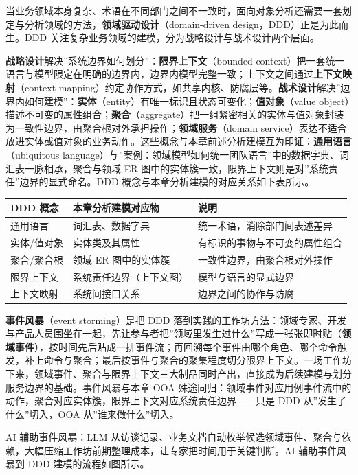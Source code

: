 \documentclass[
]{ctexbook}
\newcounter{none}
\begin{document}
当业务领域本身复杂、术语在不同部门之间不一致时，面向对象分析还需要一套划定与分析领域的方法，\textbf{领域驱动设计}（domain-driven
design，DDD）正是为此而生。DDD
关注复杂业务领域的建模，分为战略设计与战术设计两个层面。

\textbf{战略设计}解决''系统边界如何划分''：\textbf{限界上下文}（bounded
context）把一套统一语言与模型限定在明确的边界内，边界内模型完整一致；上下文之间通过\textbf{上下文映射}（context
mapping）约定协作方式，如共享内核、防腐层等。\textbf{战术设计}解决''边界内如何建模''：\textbf{实体}（entity）有唯一标识且状态可变化；\textbf{值对象}（value
object）描述不可变的属性组合；\textbf{聚合}（aggregate）把一组紧密相关的实体与值对象封装为一致性边界，由聚合根对外承担操作；\textbf{领域服务}（domain
service）表达不适合放进实体或值对象的业务动作。这些概念与本章前述分析建模互为印证：\textbf{通用语言}（ubiquitous
language）与''案例：领域模型如何统一团队语言''中的数据字典、词汇表一脉相承，聚合与领域
ER 图中的实体簇一致，限界上下文则是对''系统责任''边界的显式命名。DDD
概念与本章分析建模的对应关系如下表所示。

{\def\LTcaptype{none} %
\begin{longtable}[]{@{}lll@{}}
\toprule\noalign{}
DDD 概念 & 本章分析建模对应物 & 说明 \\
\midrule\noalign{}
\endhead
\bottomrule\noalign{}
\endlastfoot
通用语言 & 词汇表、数据字典 & 统一术语，消除部门间表述差异 \\
实体/值对象 & 实体类及其属性 & 有标识的事物与不可变的属性组合 \\
聚合/聚合根 & 领域 ER 图中的实体簇 & 一致性边界，由聚合根对外操作 \\
限界上下文 & 系统责任边界（上下文图） & 模型与语言的显式边界 \\
上下文映射 & 系统间接口关系 & 边界之间的协作与防腐 \\
\end{longtable}
}

\textbf{事件风暴}（event storming）是把 DDD
落到实践的工作坊方法：领域专家、开发与产品人员围坐在一起，先让参与者把''领域里发生过什么''写成一张张即时贴（\textbf{领域事件}），按时间先后贴成一排事件流；再回溯每个事件由哪个角色、哪个命令触发，补上命令与聚合；最后按事件与聚合的聚集程度切分限界上下文。一场工作坊下来，领域事件、聚合与限界上下文三大制品同时产出，直接成为后续建模与划分服务边界的基础。事件风暴与本章
OOA
殊途同归：领域事件对应用例事件流中的动作，聚合对应实体簇，限界上下文对应系统责任边界------只是
DDD 从''发生了什么''切入，OOA 从''谁来做什么''切入。

AI 辅助事件风暴：LLM
从访谈记录、业务文档自动枚举候选领域事件、聚合与依赖，大幅压缩工作坊前期整理成本，让专家把时间用于关键判断。AI
辅助事件风暴到 DDD 建模的流程如图所示。
\end{document}
